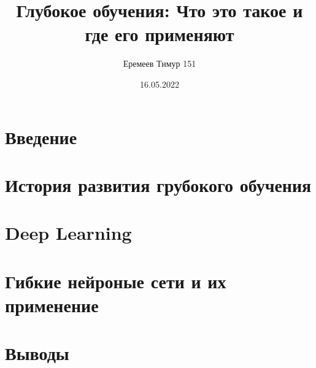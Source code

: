 \documentclass[a4paper, 12pt]{article}
\begin{document}
    \title{Глубокое обучения: Что это такое и где его применяют}
    \author{Еремеев Тимур 151}
    \date{16.05.2022}

    \maketitle


    \section*{Введение}    
    

    \section*{История развития грубокого обучения}
    

    \section*{Deep Learning}
    

    \section*{Гибкие нейроные сети и их применение}
    

    \section*{Выводы}
    
\end{document}
